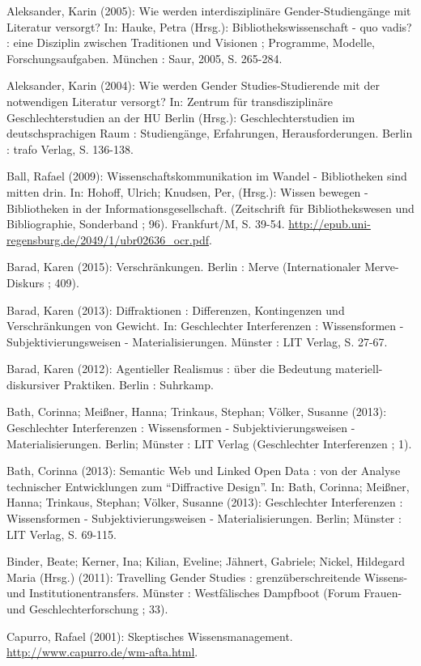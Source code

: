 Aleksander, Karin (2005): Wie werden interdisziplinäre
Gender-Studiengänge mit Literatur versorgt? In: Hauke, Petra (Hrsg.):
Bibliothekswissenschaft - quo vadis? : eine Disziplin zwischen
Traditionen und Visionen ; Programme, Modelle, Forschungsaufgaben.
München : Saur, 2005, S. 265-284.

Aleksander, Karin (2004): Wie werden Gender Studies-Studierende mit der
notwendigen Literatur versorgt? In: Zentrum für transdisziplinäre
Geschlechterstudien an der HU Berlin (Hrsg.): Geschlechterstudien im
deutschsprachigen Raum : Studiengänge, Erfahrungen, Herausforderungen.
Berlin : trafo Verlag, S. 136-138.

Ball, Rafael (2009): Wissenschaftskommunikation im Wandel - Bibliotheken
sind mitten drin. In: Hohoff, Ulrich; Knudsen, Per, (Hrsg.): Wissen
bewegen - Bibliotheken in der Informationsgesellschaft. (Zeitschrift für
Bibliothekswesen und Bibliographie, Sonderband ; 96). Frankfurt/M, S.
39-54. \url{http://epub.uni-regensburg.de/2049/1/ubr02636_ocr.pdf}.

Barad, Karen (2015): Verschränkungen. Berlin : Merve (Internationaler
Merve-Diskurs ; 409).

Barad, Karen (2013): Diffraktionen : Differenzen, Kontingenzen und
Verschränkungen von Gewicht. In: Geschlechter Interferenzen :
Wissensformen - Subjektivierungsweisen - Materialisierungen. Münster :
LIT Verlag, S. 27-67.

Barad, Karen (2012): Agentieller Realismus : über die Bedeutung
materiell-diskursiver Praktiken. Berlin : Suhrkamp.

Bath, Corinna; Meißner, Hanna; Trinkaus, Stephan; Völker, Susanne
(2013): Geschlechter Interferenzen : Wissensformen -
Subjektivierungsweisen - Materialisierungen. Berlin; Münster : LIT
Verlag (Geschlechter Interferenzen ; 1).

Bath, Corinna (2013): Semantic Web und Linked Open Data : von der
Analyse technischer Entwicklungen zum \enquote{Diffractive Design}. In:
Bath, Corinna; Meißner, Hanna; Trinkaus, Stephan; Völker, Susanne
(2013): Geschlechter Interferenzen : Wissensformen -
Subjektivierungsweisen - Materialisierungen. Berlin; Münster : LIT
Verlag, S. 69-115.

Binder, Beate; Kerner, Ina; Kilian, Eveline; Jähnert, Gabriele; Nickel,
Hildegard Maria (Hrsg.) (2011): Travelling Gender Studies :
grenzüberschreitende Wissens- und Institutionentransfers. Münster :
Westfälisches Dampfboot (Forum Frauen- und Geschlechterforschung ; 33).

Capurro, Rafael (2001): Skeptisches Wissensmanagement.
\url{http://www.capurro.de/wm-afta.html}.

